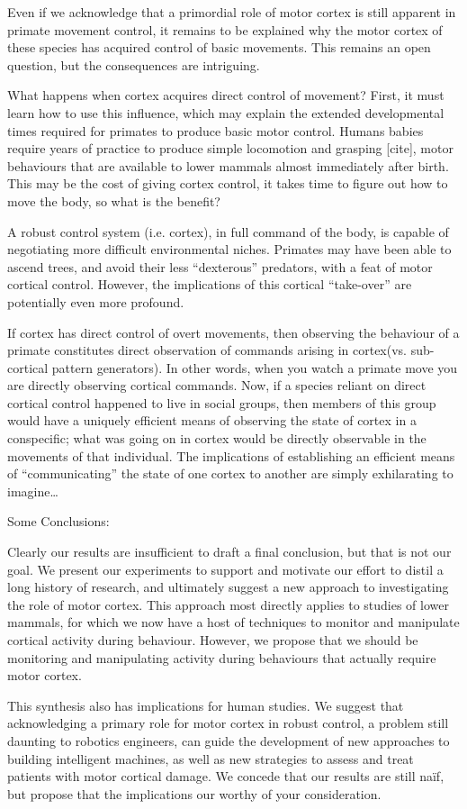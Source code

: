 Even if we acknowledge that a primordial role of motor cortex is still apparent in primate movement control, it remains to be explained why the motor cortex of these species has acquired control of basic movements. This remains an open question, but the consequences are intriguing.


What happens when cortex acquires direct control of movement? First, it must learn how to use this influence, which may explain the extended developmental times required for primates to produce basic motor control. Humans babies require years of practice to produce simple locomotion and grasping [cite], motor behaviours that are available to lower mammals almost immediately after birth. This may be the cost of giving cortex control, it takes time to figure out how to move the body, so what is the benefit? 

A robust control system (i.e. cortex), in full command of the body, is capable of negotiating more difficult environmental niches. Primates may have been able to ascend trees, and avoid their less “dexterous” predators, with a feat of motor cortical control. However, the implications of this cortical “take-over” are potentially even more profound. 

If cortex has direct control of overt movements, then observing the behaviour of a primate constitutes direct observation of commands arising in cortex(vs. sub-cortical pattern generators). In other words, when you watch a primate move you are directly observing cortical commands. Now, if a species reliant on direct cortical control happened to live in social groups, then members of this group would have a uniquely efficient means of observing the state of cortex in a conspecific; what was going on in cortex would be directly observable in the movements of that individual. The implications of establishing an efficient means of “communicating” the state of one cortex to another are simply exhilarating to imagine…



Some Conclusions:

Clearly our results are insufficient to draft a final conclusion, but that is not our goal. We present our experiments to support and motivate our effort to distil a long history of research, and ultimately suggest a new approach to investigating the role of motor cortex. This approach most directly applies to studies of lower mammals, for which we now have a host of techniques to monitor and manipulate cortical activity during behaviour. However, we propose that we should be monitoring and manipulating activity during behaviours that actually require motor cortex. 

This synthesis also has implications for human studies. We suggest that acknowledging a primary role for motor cortex in robust control, a problem still daunting to robotics engineers, can guide the development of new approaches to building intelligent machines, as well as new strategies to assess and treat patients with motor cortical damage. We concede that our results are still naïf, but propose that the implications our worthy of your consideration.

